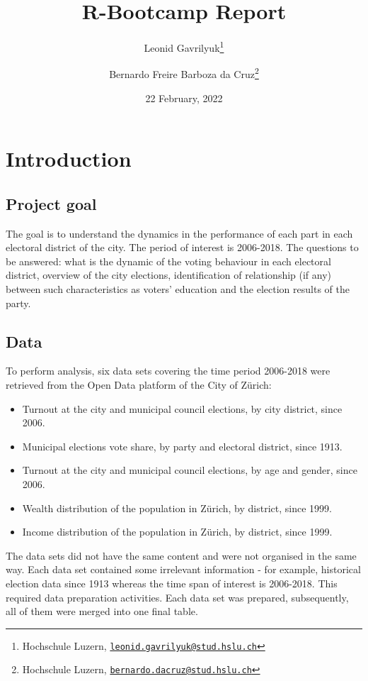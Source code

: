 \documentclass[
]{article}
\title{R-Bootcamp Report}
\author{Leonid Gavrilyuk\footnote{Hochschule Luzern,
  \href{mailto:leonid.gavrilyuk@stud.hslu.ch}{\nolinkurl{leonid.gavrilyuk@stud.hslu.ch}}} \and Bernardo
Freire Barboza da Cruz\footnote{Hochschule Luzern,
  \href{mailto:bernardo.dacruz@stud.hslu.ch}{\nolinkurl{bernardo.dacruz@stud.hslu.ch}}}}
\date{22 February, 2022}
\providecommand{\tightlist}{%
  \setlength{\itemsep}{0pt}\setlength{\parskip}{0pt}}
\begin{document}
\maketitle

\centering
\raggedright
\newpage
\tableofcontents
\pagebreak

\hypertarget{introduction}{%
\section{Introduction}\label{introduction}}

\hypertarget{project-goal}{%
\subsection{Project goal}\label{project-goal}}

The goal is to understand the dynamics in the performance of each part
in each electoral district of the city. The period of interest is
2006-2018. The questions to be answered: what is the dynamic of the
voting behaviour in each electoral district, overview of the city
elections, identification of relationship (if any) between such
characteristics as voters' education and the election results of the
party.

\hypertarget{data}{%
\subsection{Data}\label{data}}

To perform analysis, six data sets covering the time period 2006-2018
were retrieved from the Open Data platform of the City of Zürich:

\begin{itemize}
\tightlist
\item
  Turnout at the city and municipal council elections, by city district,
  since 2006.
\item
  Municipal elections vote share, by party and electoral district, since
  1913.
\item
  Turnout at the city and municipal council elections, by age and
  gender, since 2006.
\item
  Wealth distribution of the population in Zürich, by district, since
  1999.
\item
  Income distribution of the population in Zürich, by district, since
  1999.
\end{itemize}

The data sets did not have the same content and were not organised in
the same way. Each data set contained some irrelevant information - for
example, historical election data since 1913 whereas the time span of
interest is 2006-2018. This required data preparation activities. Each
data set was prepared, subsequently, all of them were merged into one
final table.
\end{document}
